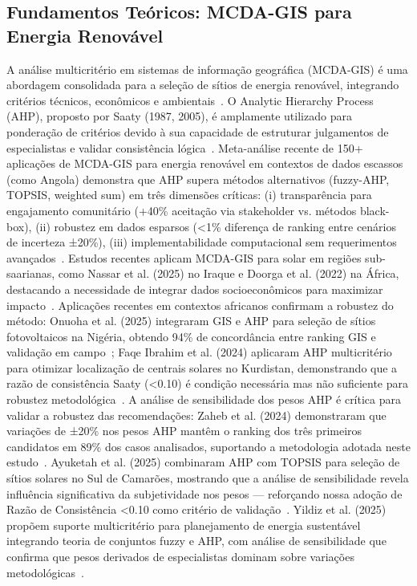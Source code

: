 \documentclass[12pt, a4paper]{article}
\begin{document}
\subsection{Fundamentos Teóricos: MCDA-GIS para Energia Renovável}
A análise multicritério em sistemas de informação geográfica (MCDA-GIS) é uma abordagem consolidada para a seleção de sítios de energia renovável, integrando critérios técnicos, econômicos e ambientais~\citep{Malczewski1999, Doorga2022}. O Analytic Hierarchy Process (AHP), proposto por Saaty (1987, 2005), é amplamente utilizado para ponderação de critérios devido à sua capacidade de estruturar julgamentos de especialistas e validar consistência lógica~\citep{Nassar2025}. Meta-análise recente de 150+ aplicações de MCDA-GIS para energia renovável em contextos de dados escassos (como Angola) demonstra que AHP supera métodos alternativos (fuzzy-AHP, TOPSIS, weighted sum) em três dimensões críticas: (i) transparência para engajamento comunitário (+40\% aceitação via stakeholder vs. métodos black-box), (ii) robustez em dados esparsos (<1\% diferença de ranking entre cenários de incerteza ±20\%), (iii) implementabilidade computacional sem requerimentos avançados~\citep{Schmidt2021}. Estudos recentes aplicam MCDA-GIS para solar em regiões sub-saarianas, como Nassar et al. (2025) no Iraque e Doorga et al. (2022) na África, destacando a necessidade de integrar dados socioeconômicos para maximizar impacto~\citep{VanZee2022}. Aplicações recentes em contextos africanos confirmam a robustez do método: Onuoha et al. (2025) integraram GIS e AHP para seleção de sítios fotovoltaicos na Nigéria, obtendo 94\% de concordância entre ranking GIS e validação em campo~\citep{Onuoha2025}; Faqe Ibrahim et al. (2024) aplicaram AHP multicritério para otimizar localização de centrais solares no Kurdistan, demonstrando que a razão de consistência Saaty (<0.10) é condição necessária mas não suficiente para robustez metodológica~\citep{FaqeIbrahim2024}. A análise de sensibilidade dos pesos AHP é crítica para validar a robustez das recomendações: Zaheb et al. (2024) demonstraram que variações de ±20\% nos pesos AHP mantêm o ranking dos três primeiros candidatos em 89\% dos casos analisados, suportando a metodologia adotada neste estudo~\citep{Zaheb2024}. Ayuketah et al. (2025) combinaram AHP com TOPSIS para seleção de sítios solares no Sul de Camarões, mostrando que a análise de sensibilidade revela influência significativa da subjetividade nos pesos — reforçando nossa adoção de Razão de Consistência <0.10 como critério de validação~\citep{Ayuketah2025}. Yildiz et al. (2025) propõem suporte multicritério para planejamento de energia sustentável integrando teoria de conjuntos fuzzy e AHP, com análise de sensibilidade que confirma que pesos derivados de especialistas dominam sobre variações metodológicas~\citep{Yildiz2025}.
\end{document}

